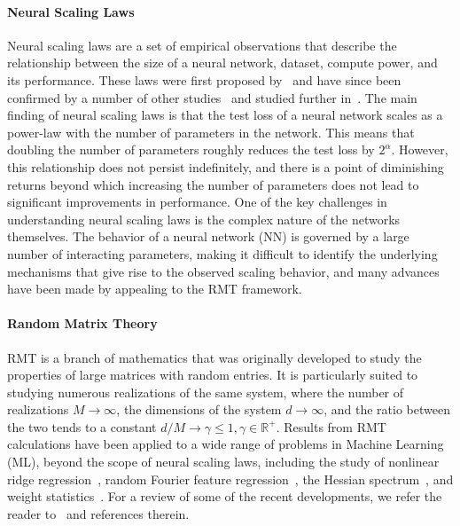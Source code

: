 \documentclass{article}
\begin{document}
\paragraph{Neural Scaling Laws}
Neural scaling laws are a set of empirical observations that describe the relationship between the size of a neural network, dataset, compute power, and its performance. These laws were first proposed by~\citet{kaplan2020scaling} and have since been confirmed by a number of other studies~\citep{maloney2022solvable, hernandez2022scaling} and studied further in~\citep{DBLP:conf/emnlp/IvgiCB22, DBLP:conf/nips/AlabdulmohsinNZ22, DBLP:journals/jmlr/SharmaK22, DBLP:conf/nips/SorscherGSGM22, DBLP:journals/corr/abs-2302-09049, DBLP:journals/corr/abs-2302-09650}.
The main finding of neural scaling laws is that the test loss of a neural network scales as a power-law with the number of parameters in the network. This means that doubling the number of parameters roughly reduces the test loss by $2^\alpha$.  However, this relationship does not persist indefinitely, and there is a point of diminishing returns beyond which increasing the number of parameters does not lead to significant improvements in performance.
One of the key challenges in understanding neural scaling laws is the complex nature of the networks themselves. The behavior of a neural network (NN) is governed by a large number of interacting parameters, making it difficult to identify the underlying mechanisms that give rise to the observed scaling behavior, and many advances have been made by appealing to the RMT framework.
%
\paragraph{Random Matrix Theory}
RMT is a branch of mathematics that was originally developed to study the properties of large matrices with random entries. It is particularly suited to studying numerous realizations of the same system, where the number of realizations $M \to \infty$, the dimensions of the system $d \to \infty$, and the ratio between the two tends to a constant $d/M \to \gamma \leq 1, \gamma \in \mathbb{R}^+$. Results from RMT calculations have been applied to a wide range of problems in Machine Learning (ML), beyond the scope of neural scaling laws, including the study of nonlinear ridge regression~\citep{pennington2017nonlinear}, random Fourier feature regression~\citep{Liao_2021}, the Hessian spectrum~\citep{liao2021hessian}, and weight statistics~\citep{martin2019traditional,Thamm}. For a review of some of the recent developments, we refer the reader to~\cite{couillet_liao_2022} and references therein.
\end{document}
